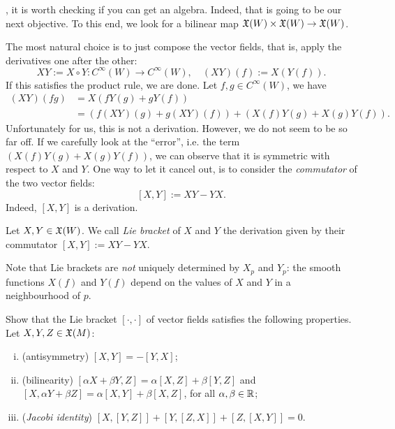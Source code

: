 , it is worth checking if you can get an algebra.
Indeed, that is going to be our next objective.
To this end, we look for a bilinear map $\mathfrak{X}(W)\times\mathfrak{X}(W) \to \mathfrak{X}(W)$.

The most natural choice is to just compose the vector fields, that is, apply the derivatives one after the other:
\begin{equation}
	X Y := X \circ Y : C^\infty(W) \to C^\infty(W), \quad
	(X Y)(f) := X(Y(f)).
\end{equation}
If this satisfies the product rule, we are done.
Let $f,g\in C^\infty(W)$, we have
\begin{align}
	(X Y)(fg) & = X(fY(g) + gY(f))                                                       \\
	          & = \left(f(X Y)(g) + g(X Y)(f)\right) + \left( X(f)Y(g) +X(g)Y(f)\right).
\end{align}
Unfortunately for us, this is not a derivation. However, we do not seem to be so far off.
If we carefully look at the ``error'', i.e. the term $\left( X(f)Y(g) +X(g)Y(f)\right)$, we can observe that it is symmetric with respect to $X$ and $Y$.
One way to let it cancel out, is to consider the \emph{commutator} of the two vector fields:
\begin{equation}\label{def:commutator}
	[X,Y] := X Y - Y X.
\end{equation}
Indeed, $[X,Y]$ is a derivation.

\begin{definition}
	Let $X,Y\in\mathfrak{X}(W)$. We call \emph{Lie bracket} of $X$ and $Y$ the derivation given by their commutator $[X,Y] := X Y - Y X$.
\end{definition}

\begin{remark}
	Note that Lie brackets are \emph{not} uniquely determined by $X_p$ and $Y_p$: the smooth functions $X(f)$ and $Y(f)$ depend on the values of $X$ and $Y$ in a neighbourhood of $p$.
\end{remark}

\begin{exercise}\label{ex:vfliealgebra}
	Show that the Lie bracket $[\cdot,\cdot]$ of vector fields satisfies the following properties. Let $X,Y,Z\in\mathfrak{X}(M)$:
	\begin{enumerate}[(i)]
		\item (antisymmetry) $[X, Y] = - [Y, X]$;
		\item (bilinearity) $[\alpha X + \beta Y, Z] = \alpha [X, Z] + \beta [Y, Z]$ and $[X, \alpha Y + \beta Z] = \alpha [X, Y] + \beta [X, Z]$, for all $\alpha,\beta \in\mathbb{R}$;
		\item (\emph{Jacobi identity}) $[X,[Y,Z]] + [Y,[Z,X]] + [Z,[X,Y]] = 0$.
	\end{enumerate}
\end{exercise}

